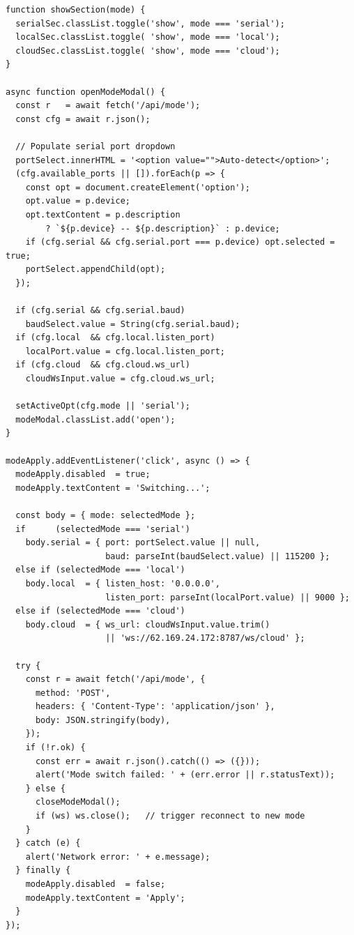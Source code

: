 \begin{lstlisting}[caption={Mode-switcher --- modal open, section toggle, and Apply handler}, label={lst:js-mode}]
function showSection(mode) {
  serialSec.classList.toggle('show', mode === 'serial');
  localSec.classList.toggle( 'show', mode === 'local');
  cloudSec.classList.toggle( 'show', mode === 'cloud');
}

async function openModeModal() {
  const r   = await fetch('/api/mode');
  const cfg = await r.json();

  // Populate serial port dropdown
  portSelect.innerHTML = '<option value="">Auto-detect</option>';
  (cfg.available_ports || []).forEach(p => {
    const opt = document.createElement('option');
    opt.value = p.device;
    opt.textContent = p.description
        ? `${p.device} -- ${p.description}` : p.device;
    if (cfg.serial && cfg.serial.port === p.device) opt.selected = true;
    portSelect.appendChild(opt);
  });

  if (cfg.serial && cfg.serial.baud)
    baudSelect.value = String(cfg.serial.baud);
  if (cfg.local  && cfg.local.listen_port)
    localPort.value = cfg.local.listen_port;
  if (cfg.cloud  && cfg.cloud.ws_url)
    cloudWsInput.value = cfg.cloud.ws_url;

  setActiveOpt(cfg.mode || 'serial');
  modeModal.classList.add('open');
}

modeApply.addEventListener('click', async () => {
  modeApply.disabled  = true;
  modeApply.textContent = 'Switching...';

  const body = { mode: selectedMode };
  if      (selectedMode === 'serial')
    body.serial = { port: portSelect.value || null,
                    baud: parseInt(baudSelect.value) || 115200 };
  else if (selectedMode === 'local')
    body.local  = { listen_host: '0.0.0.0',
                    listen_port: parseInt(localPort.value) || 9000 };
  else if (selectedMode === 'cloud')
    body.cloud  = { ws_url: cloudWsInput.value.trim()
                    || 'ws://62.169.24.172:8787/ws/cloud' };

  try {
    const r = await fetch('/api/mode', {
      method: 'POST',
      headers: { 'Content-Type': 'application/json' },
      body: JSON.stringify(body),
    });
    if (!r.ok) {
      const err = await r.json().catch(() => ({}));
      alert('Mode switch failed: ' + (err.error || r.statusText));
    } else {
      closeModeModal();
      if (ws) ws.close();   // trigger reconnect to new mode
    }
  } catch (e) {
    alert('Network error: ' + e.message);
  } finally {
    modeApply.disabled  = false;
    modeApply.textContent = 'Apply';
  }
});
\end{lstlisting}


